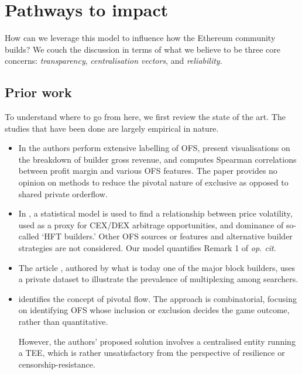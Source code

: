 

\section*{Pathways to impact}

How can we leverage this model to influence how the Ethereum community builds?
%
We couch the discussion in terms of what we believe to be three core concerns: \emph{transparency}, \emph{centralisation vectors}, and \emph{reliability}.

\subsection*{Prior work}

To understand where to go from here, we first review the state of the art.
%
The studies that have been done are largely empirical in nature.
%
\begin{itemize}
  \item 
    In \cite{oz2024whoa} the authors perform extensive labelling of OFS, present visualisations on the breakdown of builder gross revenue, and computes Spearman correlations between profit margin and various OFS features.
    The paper provides no opinion on methods to reduce the pivotal nature of exclusive as opposed to shared private orderflow.
      
  \item 
    In \cite{gupta2023centralizing}, a statistical model is used to find a relationship between price volatility, used as a proxy for CEX/DEX arbitrage opportunities, and dominance of so-called `HFT builders.'
    Other OFS sources or features and alternative builder strategies are not considered.
    Our model quantifies Remark 1 of \emph{op. cit}.

  \item
    The article \cite{titan2023builder}, authored by what is today one of the major block builders, uses a private dataset to illustrate the prevalence of multiplexing among searchers.

  \item
    \cite{yang2024decentralization} identifies the concept of pivotal flow.
    The approach is combinatorial, focusing on identifying OFS whose inclusion or exclusion decides the game outcome, rather than quantitative.
    
    However, the authors' proposed solution involves a centralised entity running a TEE, which is rather unsatisfactory from the perspective of resilience or censorship-resistance.
  
\end{itemize}


